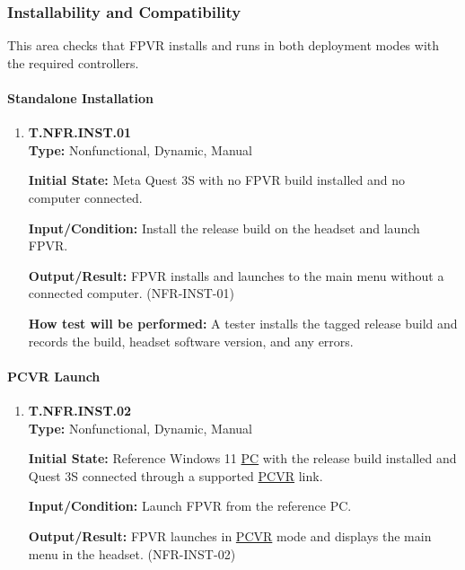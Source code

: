 \documentclass[12pt, titlepage]{article}
\begin{document}
\subsubsection{Installability and Compatibility}

This area checks that FPVR installs and runs in both deployment modes with the required
controllers.

{\sloppy
\paragraph{Standalone Installation}

\begin{enumerate}

\item{\hypertarget{test-nfr-ins01}{}\textbf{T.NFR.INST.01}\\}
\textbf{Type:} Nonfunctional, Dynamic, Manual

\textbf{Initial State:} Meta Quest 3S with no FPVR build installed and no computer
connected.

\textbf{Input/Condition:} Install the release build on the headset and launch FPVR.

\textbf{Output/Result:} FPVR installs and launches to the main menu without a connected
computer. (\mbox{NFR-INST-01})

\textbf{How test will be performed:} A tester installs the tagged release build and
records the build, headset software version, and any errors.

\end{enumerate}

\paragraph{PCVR Launch}

\begin{enumerate}

\item{\hypertarget{test-nfr-ins02}{}\textbf{T.NFR.INST.02}\\}
\textbf{Type:} Nonfunctional, Dynamic, Manual

\textbf{Initial State:} Reference Windows 11 \hyperlink{abbr:PC}{PC} with the release build installed and
Quest 3S connected through a supported \hyperlink{abbr:PCVR}{PCVR} link.

\textbf{Input/Condition:} Launch FPVR from the reference PC.

\textbf{Output/Result:} FPVR launches in \hyperlink{abbr:PCVR}{PCVR} mode and displays the main menu in the
headset. (\mbox{NFR-INST-02})


\end{enumerate}}
\end{document}
